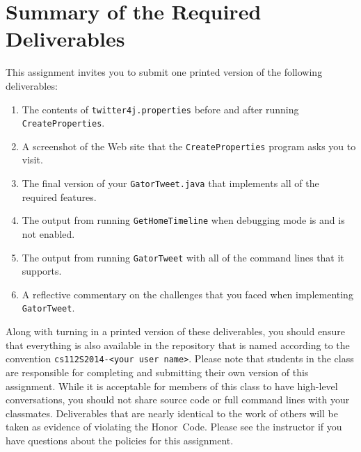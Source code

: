 \section*{Summary of the Required Deliverables}

  This assignment invites you to submit one printed version of the following deliverables: 

  \begin{enumerate}
    \item The contents of {\tt twitter4j.properties} before and after running {\tt CreateProperties}.
    \item A screenshot of the Web site that the {\tt CreateProperties} program asks you to visit.
    \item The final version of your {\tt GatorTweet.java} that implements all of the required features.
    \item The output from running {\tt GetHomeTimeline} when debugging mode is and is not enabled.
    \item The output from running {\tt GatorTweet} with all of the command lines that it supports.
    \item A reflective commentary on the challenges that you faced when implementing {\tt GatorTweet}.
  \end{enumerate}

  Along with turning in a printed version of these deliverables, you should ensure that everything is also available in
  the repository that is named according to the convention {\tt cs112S2014-<your user name>}. Please note that students
  in the class are responsible for completing and submitting their own version of this assignment.    While it is
  acceptable for members of this class to have high-level conversations, you should not share source code or full
  command lines with your classmates.  Deliverables that are nearly identical to the work of others will be taken as
  evidence of violating the \mbox{Honor Code}.  Please see the instructor if you have questions about the policies for
  this assignment.

  
